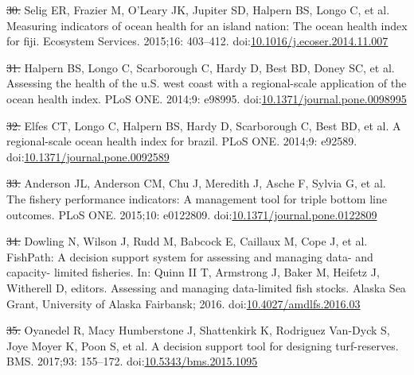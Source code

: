 \documentclass[12pt,]{article}
\providecommand{\DIFaddtex}[1]{{\protect\color{blue}\uwave{#1}}} %
\providecommand{\DIFdeltex}[1]{{\protect\color{red}\sout{#1}}}                      %
\providecommand{\DIFaddbegin}{} %
\providecommand{\DIFaddend}{} %
\providecommand{\DIFdelbegin}{} %
\providecommand{\DIFdelend}{} %
\providecommand{\DIFadd}[1]{\texorpdfstring{\DIFaddtex{#1}}{#1}} %
\providecommand{\DIFdel}[1]{\texorpdfstring{\DIFdeltex{#1}}{}} %
\newcommand{\DIFscaledelfig}{0.5}
\newlength{\DIFdelgraphicswidth} %
\newlength{\DIFdelgraphicsheight} %
\newcommand{\DIFaddincludegraphics}[2][]{{\color{blue}\fbox{\DIFOincludegraphics[#1]{#2}}}} %
\newcommand{\DIFdelincludegraphics}[2][]{%
\sbox{\DIFdelgraphicsbox}{\DIFOincludegraphics[#1]{#2}}%
\settoboxwidth{\DIFdelgraphicswidth}{\DIFdelgraphicsbox} %
\settoboxtotalheight{\DIFdelgraphicsheight}{\DIFdelgraphicsbox} %
\scalebox{\DIFscaledelfig}{%
\parbox[b]{\DIFdelgraphicswidth}{\usebox{\DIFdelgraphicsbox}\\[-\baselineskip] \rule{\DIFdelgraphicswidth}{0em}}\llap{\resizebox{\DIFdelgraphicswidth}{\DIFdelgraphicsheight}{%
\setlength{\unitlength}{\DIFdelgraphicswidth}%
\begin{picture}(1,1)%
\thicklines\linethickness{2pt} %
{\color[rgb]{1,0,0}\put(0,0){\framebox(1,1){}}}%
{\color[rgb]{1,0,0}\put(0,0){\line( 1,1){1}}}%
{\color[rgb]{1,0,0}\put(0,1){\line(1,-1){1}}}%
\end{picture}%
}\hspace*{3pt}}} %
} %
\DeclareRobustCommand{\DIFaddbegin}{\DIFOaddbegin \let\includegraphics\DIFaddincludegraphics} %
\DeclareRobustCommand{\DIFaddend}{\DIFOaddend \let\includegraphics\DIFOincludegraphics} %
\DeclareRobustCommand{\DIFdelbegin}{\DIFOdelbegin \let\includegraphics\DIFdelincludegraphics} %
\DeclareRobustCommand{\DIFdelend}{\DIFOaddend \let\includegraphics\DIFOincludegraphics} %
\begin{document}
\hypertarget{ref-selig_2015-F9}{}
\DIFdelbegin \DIFdel{30. }\DIFdelend \DIFaddbegin \DIFadd{31. }\DIFaddend Selig ER, Frazier M, O'Leary JK, Jupiter SD, Halpern BS, Longo C, et
al. Measuring indicators of ocean health for an island nation: The ocean
health index for fiji. Ecosystem Services. 2015;16: 403--412.
doi:\href{https://doi.org/10.1016/j.ecoser.2014.11.007}{10.1016/j.ecoser.2014.11.007}

\hypertarget{ref-halpern_2014-lQ}{}
\DIFdelbegin \DIFdel{31. }\DIFdelend \DIFaddbegin \DIFadd{32. }\DIFaddend Halpern BS, Longo C, Scarborough C, Hardy D, Best BD, Doney SC, et
al. Assessing the health of the u.S. west coast with a regional-scale
application of the ocean health index. PLoS ONE. 2014;9: e98995.
doi:\href{https://doi.org/10.1371/journal.pone.0098995}{10.1371/journal.pone.0098995}

\hypertarget{ref-elfes_2014-RC}{}
\DIFdelbegin \DIFdel{32. }\DIFdelend \DIFaddbegin \DIFadd{33. }\DIFaddend Elfes CT, Longo C, Halpern BS, Hardy D, Scarborough C, Best BD, et
al. A regional-scale ocean health index for brazil. PLoS ONE. 2014;9:
e92589.
doi:\href{https://doi.org/10.1371/journal.pone.0092589}{10.1371/journal.pone.0092589}

\hypertarget{ref-anderson_2015-ND}{}
\DIFdelbegin \DIFdel{33. }\DIFdelend \DIFaddbegin \DIFadd{34. }\DIFaddend Anderson JL, Anderson CM, Chu J, Meredith J, Asche F, Sylvia G, et
al. The fishery performance indicators: A management tool for triple
bottom line outcomes. PLoS ONE. 2015;10: e0122809.
doi:\href{https://doi.org/10.1371/journal.pone.0122809}{10.1371/journal.pone.0122809}

\hypertarget{ref-dowling_2016-pO}{}
\DIFdelbegin \DIFdel{34. }\DIFdelend \DIFaddbegin \DIFadd{35. }\DIFaddend Dowling N, Wilson J, Rudd M, Babcock E, Caillaux M, Cope J, et al.
FishPath: A decision support system for assessing and managing data- and
capacity- limited fisheries. In: Quinn II T, Armstrong J, Baker M,
Heifetz J, Witherell D, editors. Assessing and managing data-limited
fish stocks. Alaska Sea Grant, University of Alaska Fairbansk; 2016.
doi:\href{https://doi.org/10.4027/amdlfs.2016.03}{10.4027/amdlfs.2016.03}

\hypertarget{ref-oyanedel_2017-TO}{}
\DIFdelbegin \DIFdel{35. }\DIFdelend \DIFaddbegin \DIFadd{36. }\DIFaddend Oyanedel R, Macy Humberstone J, Shattenkirk K, Rodriguez Van-Dyck S,
Joye Moyer K, Poon S, et al. A decision support tool for designing
turf-reserves. BMS. 2017;93: 155--172.
doi:\href{https://doi.org/10.5343/bms.2015.1095}{10.5343/bms.2015.1095}
\end{document}
